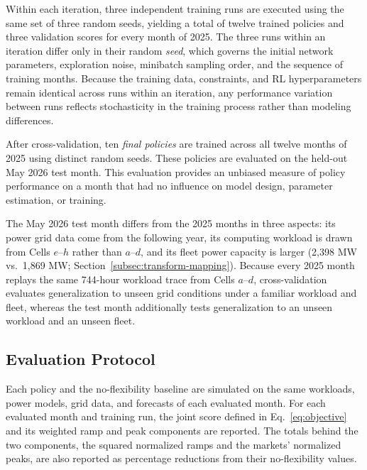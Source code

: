 \documentclass{UNCC-thesis}
\begin{document}
Within each iteration, three independent training runs are executed using the same set of
three random seeds, yielding a total of twelve trained policies and three validation scores
for every month of 2025. The three runs within an iteration differ only in their
random \emph{seed}, which governs the initial network parameters, exploration noise,
minibatch sampling order, and the sequence of training months. Because the training data,
constraints, and RL hyperparameters remain identical across runs within an iteration, any
performance variation between runs reflects stochasticity in the training process rather
than modeling differences.

After cross-validation, ten \emph{final policies} are trained across all twelve months of
2025 using distinct random seeds. These policies are evaluated on the held-out May 2026 test
month. This evaluation provides an unbiased measure of policy performance on a month that
had no influence on model design, parameter estimation, or training.

The May 2026 test month differs from the 2025 months in three aspects: its power grid data
come from the following year, its computing workload is drawn from Cells \(e\)--\(h\) rather
than \(a\)--\(d\), and its fleet power capacity is larger (2,398 MW vs.\ 1,869 MW;
Section~\ref{subsec:transform-mapping}). Because every 2025 month
replays the same 744-hour workload trace from Cells \(a\)--\(d\), cross-validation evaluates
generalization to unseen grid conditions under a familiar workload and fleet, whereas the
test month additionally tests generalization to an unseen workload and an unseen fleet.

\subsection{Evaluation Protocol}
\label{subsec:method-protocol}

Each policy and the no-flexibility baseline are simulated on the same workloads, power models,
grid data, and forecasts of each evaluated month. For each evaluated month and training run, the
joint score defined in Eq.~\eqref{eq:objective} and its weighted ramp and peak components are
reported. The totals behind the two components, the squared normalized ramps and the markets'
normalized peaks, are also reported as percentage reductions from their no-flexibility values.
\end{document}
